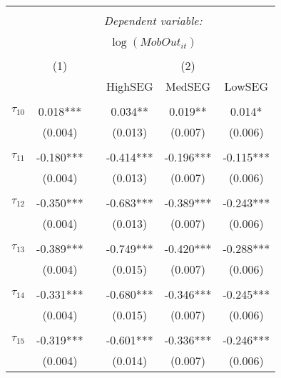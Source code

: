 \begin{tabular}{@{\extracolsep{-0pt}}lccccc} 
\\[-1.8ex]\hline 
\hline \\[-1.8ex] 
 & \multicolumn{5}{c}{\textit{Dependent variable:}} \\ 
\cline{2-6} 
\\[-1.8ex] & \multicolumn{5}{c}{$\log(MobOut_{it})$}\\ 
\\[-1.8ex] & (1) && \multicolumn{3}{c}{(2)} \\ 
\cline{2-2}\cline{4-6}
        &&& HighSEG & MedSEG & LowSEG  \\
 \\[-1.8ex] 
$\tau_{10}$     & 0.018***  &&  0.034**  &  0.019**  &   0.014*  \\
                &  (0.004)  &&  (0.013)  &  (0.007)  &  (0.006)  \\
                &           &&           &           &           \\[-2.1ex]
$\tau_{11}$     & -0.180*** && -0.414*** & -0.196*** & -0.115*** \\
                &  (0.004)  &&  (0.013)  &  (0.007)  &  (0.006)  \\
                &           &&           &           &           \\[-2.1ex]
$\tau_{12}$     & -0.350*** && -0.683*** & -0.389*** & -0.243*** \\
                &  (0.004)  &&  (0.013)  &  (0.007)  &  (0.006)  \\
                &           &&           &           &           \\[-2.1ex]
$\tau_{13}$     & -0.389*** && -0.749*** & -0.420*** & -0.288*** \\
                &  (0.004)  &&  (0.015)  &  (0.007)  &  (0.006)  \\
                &           &&           &           &           \\[-2.1ex]
$\tau_{14}$     & -0.331*** && -0.680*** & -0.346*** & -0.245*** \\
                &  (0.004)  &&  (0.015)  &  (0.007)  &  (0.006)  \\
                &           &&           &           &           \\[-2.1ex]
$\tau_{15}$     & -0.319*** && -0.601*** & -0.336*** & -0.246*** \\
                &  (0.004)  &&  (0.014)  &  (0.007)  &  (0.006)  \\

\end{tabular}
